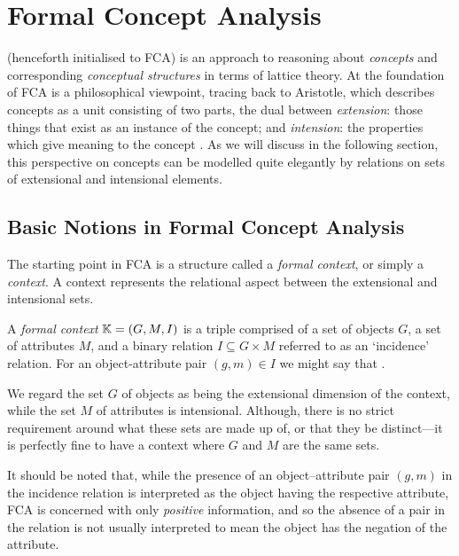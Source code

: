 \chapter{Formal Concept Analysis}
\label{chapter:formal-concept-analysis}

\FCA (henceforth initialised to FCA) is an approach to reasoning about \textit{concepts} and corresponding \textit{conceptual structures} in terms of lattice theory. At the foundation of FCA is a philosophical viewpoint, tracing back to Aristotle, which describes concepts as a unit consisting of two parts, the dual between \textit{extension}: those things that exist as an instance of the concept; and \textit{intension}: the properties which give meaning to the concept \cite[p. 1]{WILLE1992493} \cite[p. 414]{DUQUENNE1999407}. As we will discuss in the following section, this perspective on concepts can be modelled quite elegantly by relations on sets of extensional and intensional elements.  

\section{Basic Notions in Formal Concept Analysis}
\label{section:basic-notions}

The starting point in FCA is a structure called a \textit{formal context}, or simply a \textit{context}. A context represents the relational aspect between the extensional and intensional sets. 
%
\begin{definition}
\label{definition:formal-context} 
  A \textit{formal context} $\mathbb{K} = (G,M,I)$ is a triple comprised of a set of objects $G$, a set of attributes $M$, and a binary relation $I \subseteq G \times M$ referred to as an `incidence' relation. For an object-attribute pair $(g,m) \in I$ we might say that .
\end{definition}
%
We regard the set $G$ of objects as being the extensional dimension of the context, while the set $M$ of attributes is intensional. Although, there is no strict requirement around what these sets are made up of, or that they be distinct---it is perfectly fine to have a context where $G$ and $M$ are the same sets.

It should be noted that, while the presence of an object–attribute pair $(g,m)$ in the incidence relation is interpreted as the object having the respective attribute, FCA is concerned with only \textit{positive} information, and so the absence of a pair in the relation is not usually interpreted to mean the object has the negation of the attribute. 

